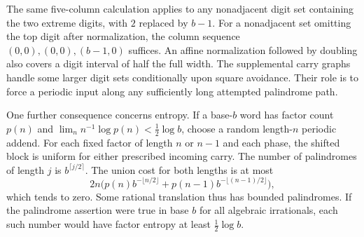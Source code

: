 The same five-column calculation applies to any nonadjacent digit set containing the two extreme digits, with $2$ replaced by $b-1$. For a nonadjacent set omitting the top digit after normalization, the column sequence $(0,0),(0,0),(b-1,0)$ suffices. An affine normalization followed by doubling also covers a digit interval of half the full width. The supplemental carry graphs handle some larger digit sets conditionally upon square avoidance. Their role is to force a periodic input along any sufficiently long attempted palindrome path.

One further consequence concerns entropy. If a base-$b$ word has factor count $p(n)$ and $\lim_n n^{-1}\log p(n)<\frac12\log b$, choose a random length-$n$ periodic addend. For each fixed factor of length $n$ or $n-1$ and each phase, the shifted block is uniform for either prescribed incoming carry. The number of palindromes of length $j$ is $b^{\lceil j/2\rceil}$. The union cost for both lengths is at most
\[
 2n\bigl(p(n)b^{-\lfloor n/2\rfloor}+p(n-1)b^{-\lfloor(n-1)/2\rfloor}\bigr),
\]
which tends to zero. Some rational translation thus has bounded palindromes. If the palindrome assertion were true in base $b$ for all algebraic irrationals, each such number would have factor entropy at least $\frac12\log b$.

